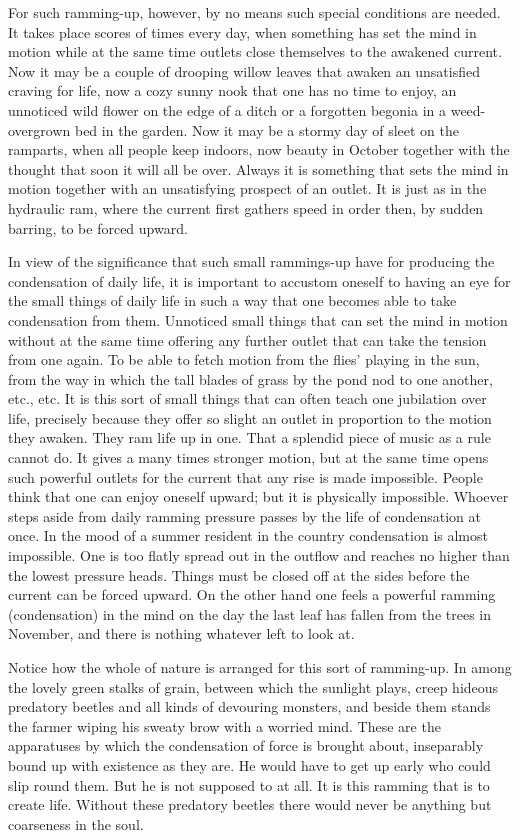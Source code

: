 \documentclass[12pt,a4paper,openany]{book}
\newcommand{\opage}[1]{\marginnote{\footnotesize\textit{[#1]}}}
\begin{document}
For such ramming-up, however, by no means such special
conditions are needed. It takes place scores of times every day, when
something has set the mind in motion while at the same time outlets
close themselves to the awakened current. Now it may be a couple of drooping
willow leaves that awaken an unsatisfied craving for life,
now a cozy sunny nook that one has no time to enjoy, an
unnoticed wild flower on the edge of a ditch or a forgotten begonia
in a weed-overgrown bed in the garden. Now it may
be a stormy day of sleet on the ramparts, when all people
keep indoors, now beauty in October together with
the thought that soon it will all be over. Always it is
something that sets the mind in motion together with an unsatisfying
prospect of an outlet. It is just as in the hydraulic ram,
where the current first gathers speed in order then, by
sudden barring, to be forced upward.

In view of the significance that such small rammings-up
have for producing the condensation of daily life, it is
important to accustom oneself to having an eye for the small things of daily
life in such a way that one becomes able to take condensation
from them. Unnoticed small things that can set the mind in
motion without at the same time offering any further outlet
that can take the tension from one again. To be able to fetch motion
from the flies' playing in the sun, from the way in which the
tall blades of grass by the pond nod to one another, etc., etc.
It is this sort of small things that can often teach one jubilation
over life, precisely because they offer so slight an outlet in proportion
to the motion they awaken. They ram life up in one. That
a splendid piece of music as a rule cannot do. It gives
a many times stronger motion, but at the same time opens
such powerful outlets for the current that any rise
is made impossible. People think that one can enjoy oneself upward; but
it is physically impossible. Whoever steps aside from daily
\setcounter{footnote}{0}%
\opage{292}ramming pressure passes by the life of condensation at once.
In the mood of a summer resident in the country condensation is almost impossible. One is
too flatly spread out in the outflow and reaches no higher than the lowest
pressure heads. Things must be closed off at the sides before the current
can be forced upward. On the other hand one feels a powerful ramming
(condensation) in the mind on the day the last leaf has fallen
from the trees in November, and there is nothing whatever left to
look at.

Notice how the whole of nature is arranged for
this sort of ramming-up. In among the lovely green stalks of grain,
between which the sunlight plays, creep hideous predatory beetles
and all kinds of devouring monsters, and beside them stands the farmer
wiping his sweaty brow with a worried mind. These are the apparatuses
by which the condensation of force is brought about, inseparably
bound up with existence as they are. He would have to get up early
who could slip round them. But he is not supposed to at all.
It is this ramming that is to create life. Without these
predatory beetles there would never be anything but coarseness in the soul.
\end{document}
